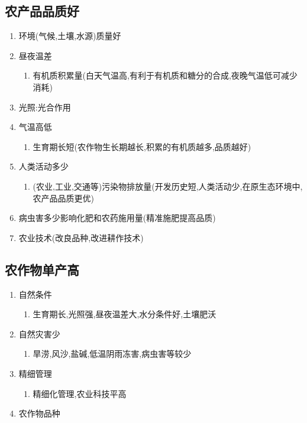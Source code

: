 \documentclass[a4paper]{article}
\begin{document}
    \subsection{农产品品质好}
    \begin{enumerate}
        \item 环境(气候,土壤,水源)质量好
        \item 昼夜温差
        \begin{enumerate}
            \item 有机质积累量(白天气温高,有利于有机质和糖分的合成,夜晚气温低可减少消耗)
        \end{enumerate}
        \item 光照:光合作用
        \item 气温高低
        \begin{enumerate}
            \item 生育期长短(农作物生长期越长,积累的有机质越多,品质越好) %
        \end{enumerate}
        \item 人类活动多少
        \begin{enumerate}
            \item (农业,工业,交通等)污染物排放量(开发历史短,人类活动少,在原生态环境中,农产品品质更优)
        \end{enumerate}
        \item 病虫害多少影响化肥和农药施用量(精准施肥提高品质)
        \item 农业技术(改良品种,改进耕作技术)
    \end{enumerate}
    \subsection{农作物单产高}
    \begin{enumerate}
        \item 自然条件
        \begin{enumerate}
            \item 生育期长,光照强,昼夜温差大,水分条件好,土壤肥沃
        \end{enumerate}
        \item 自然灾害少
        \begin{enumerate}
            \item 旱涝,风沙,盐碱,低温阴雨冻害,病虫害等较少
        \end{enumerate}
        \item 精细管理
        \begin{enumerate}
            \item 精细化管理,农业科技平高
        \end{enumerate}
        \item 农作物品种
    \end{enumerate}
\end{document}
